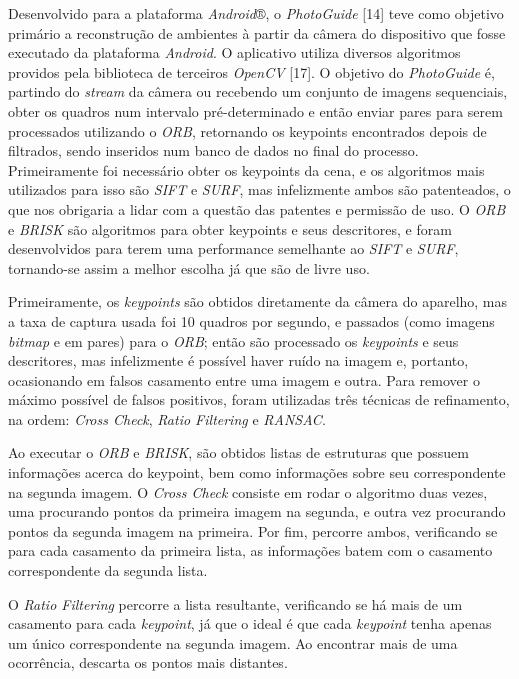 Desenvolvido para a plataforma \textit{Android}®, o \textit{PhotoGuide} [14] teve como objetivo primário a reconstrução de ambientes à partir da câmera do dispositivo que fosse executado da plataforma \textit{Android}. O aplicativo utiliza diversos algoritmos providos pela biblioteca de terceiros \textit{OpenCV} [17]. O objetivo do \textit{PhotoGuide} é, partindo do \textit{stream} da câmera ou recebendo um conjunto de imagens sequenciais, obter os quadros num intervalo pré-determinado e então enviar pares para serem processados utilizando o \textit{ORB}, retornando os keypoints encontrados depois de filtrados, sendo inseridos num banco de dados no final do processo.  Primeiramente foi necessário obter os keypoints da cena, e os algoritmos mais utilizados para isso são \textit{SIFT} e \textit{SURF}, mas infelizmente ambos são patenteados, o que nos obrigaria a lidar com a questão das patentes e permissão de uso. O \textit{ORB} e \textit{BRISK} são algoritmos para obter keypoints e seus descritores, e foram desenvolvidos para terem uma performance semelhante ao \textit{SIFT} e\textit{ SURF}, tornando-se assim a melhor escolha já que são de livre uso.

Primeiramente, os \textit{keypoints} são obtidos diretamente da câmera do aparelho, mas a taxa de captura usada foi 10 quadros por segundo, e passados (como imagens \textit{bitmap} e em pares) para o \textit{ORB}; então são processado os \textit{keypoints} e seus descritores, mas infelizmente é possível haver ruído na imagem e, portanto, ocasionando em falsos casamento entre uma imagem e outra. Para remover o máximo possível de falsos positivos, foram utilizadas três técnicas de refinamento, na ordem: \textit{Cross Check}, \textit{Ratio Filtering} e \textit{RANSAC}.

Ao executar o \textit{ORB} e \textit{BRISK}, são obtidos listas de estruturas que possuem informações acerca do keypoint, bem como informações sobre seu correspondente na segunda imagem. O \textit{Cross Check} consiste em rodar o algoritmo duas vezes, uma procurando pontos da primeira imagem na segunda, e outra vez procurando pontos da segunda imagem na primeira. Por fim, percorre ambos, verificando se para cada casamento da primeira lista, as informações batem com o casamento correspondente da segunda lista.

O \textit{Ratio Filtering} percorre a lista resultante, verificando se há mais de um casamento para cada \textit{keypoint}, já que o ideal é que cada \textit{keypoint} tenha apenas um único correspondente na segunda imagem. Ao encontrar mais de uma ocorrência, descarta os pontos mais distantes.

